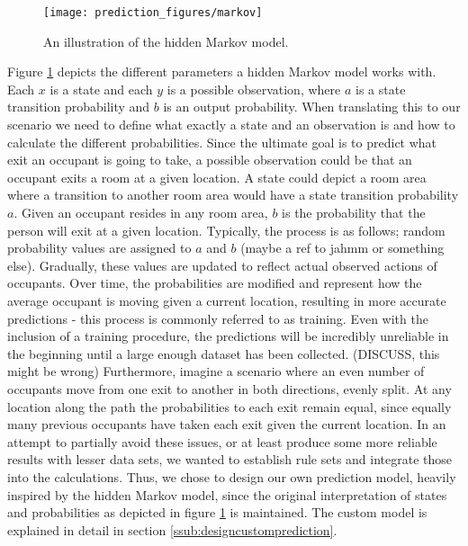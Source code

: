 \begin{figure}
\centering
\texttt{[image: prediction\_figures/markov]}
\caption{An illustration of the hidden Markov model.}
\label{fig:markov}
\end{figure}
Figure \ref{fig:markov} depicts the different parameters a hidden Markov model works with. Each \(x\) is a state and each \(y\) is a possible observation, where \(a\) is a state transition probability and \(b\) is an output probability. When translating this to our scenario we need to define what exactly a state and an observation is and how to calculate the different probabilities. Since the ultimate goal is to predict what exit an occupant is going to take, a possible observation could be that an occupant exits a room at a given location. A state could depict a room area where a transition to another room area would have a state transition probability \(a\). Given an occupant resides in any room area, \(b\) is the probability that the person will exit at a given location. Typically, the process is as follows; random probability values are assigned to \(a\) and \(b\) (maybe a ref to jahmm or something else). Gradually, these values are updated to reflect actual observed actions of occupants. Over time, the probabilities are modified and represent how the average occupant is moving given a current location, resulting in more accurate predictions - this process is commonly referred to as training. Even with the inclusion of a training procedure, the predictions will be incredibly unreliable in the beginning until a large enough dataset has been collected. (DISCUSS, this might be wrong) Furthermore, imagine a scenario where an even number of occupants move from one exit to another in both directions, evenly split. At any location along the path the probabilities to each exit remain equal, since equally many previous occupants have taken each exit given the current location. In an attempt to partially avoid these issues, or at least produce some more reliable results with lesser data sets, we wanted to establish rule sets and integrate those into the calculations. Thus, we chose to design our own prediction model, heavily inspired by the hidden Markov model, since the original interpretation of states and probabilities as depicted in figure \ref{fig:markov} is maintained. The custom model is explained in detail in section \ref{ssub:designcustomprediction}. 